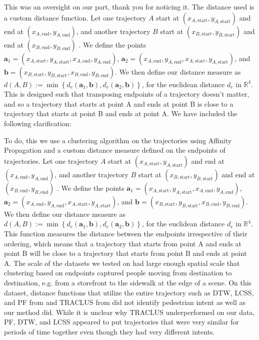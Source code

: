 \documentclass[usenames,dvipsnames]{article}
\providecommand{\response}[1]{
\noindent
\noindent\colorbox{gray!20}{
\parbox{\textwidth}{
\setlength{\parskip}{.1in}
\setlength{\parindent}{.1in}
#1}
}
}
\begin{document}
\begin{enumerate}
\begin{item}
This was an oversight on our part, thank you for noticing it. 
The distance used is a custom distance function. 
Let one trajectory $A$ start at $(x_{A,\mathrm{start}}, y_{A,\mathrm{start}})$ and end at  $(x_{A,\mathrm{end}}, y_{A,\mathrm{end}})$, and another trajectory $B$ start at $(x_{B,\mathrm{start}}, y_{B,\mathrm{start}})$ and end at $(x_{B,\mathrm{end}}, y_{B,\mathrm{end}})$ . 
We define the points $\mathbf{a}_1 = (x_{A, \mathrm{start}}, y_{A, \mathrm{start}}, x_{A, \mathrm{end}}, y_{A, \mathrm{end}})$, $\mathbf{a}_2 = (x_{A, \mathrm{end}}, y_{A, \mathrm{end}}, x_{A, \mathrm{start}}, y_{A, \mathrm{start}})$, and $\mathbf{b} = (x_{B, \mathrm{start}}, y_{B, \mathrm{start}}, x_{B, \mathrm{end}}, y_{B, \mathrm{end}})$. 
We then define our distance measure as $d(A, B) :=  \min \left\{ d_e(\mathbf{a}_1, \mathbf{b}), d_e(\mathbf{a}_2, \mathbf{b}) \right\}$, for the euclidean distance $d_e$ in $\mathbb{R}^4$.  This is designed such that transposing endpoints of a trajectory doesn't matter, and so a trajectory that starts at point A and ends at point B is close to a trajectory that starts at point B and ends at point A.  
We have included the following clarification:

\reversemarginpar{}
\response{To do, this we use a clustering algorithm on the trajectories using Affinity Propagation \cite{FreyDueck2007} and a custom distance measure defined on the endpoints of trajectories. 
	Let one trajectory $A$ start at $(x_{A,\mathrm{start}}, y_{A,\mathrm{start}})$ and end at  $(x_{A,\mathrm{end}}, y_{A,\mathrm{end}})$, and another trajectory $B$ start at $(x_{B,\mathrm{start}}, y_{B,\mathrm{start}})$ and end at $(x_{B,\mathrm{end}}, y_{B,\mathrm{end}})$ . 
	We define the points $\mathbf{a}_1 = (x_{A, \mathrm{start}}, y_{A, \mathrm{start}}, x_{A, \mathrm{end}}, y_{A, \mathrm{end}})$, $\mathbf{a}_2 = (x_{A, \mathrm{end}}, y_{A, \mathrm{end}}, x_{A, \mathrm{start}}, y_{A, \mathrm{start}})$, and $\mathbf{b} = (x_{B, \mathrm{start}}, y_{B, \mathrm{start}}, x_{B, \mathrm{end}}, y_{B, \mathrm{end}})$. 
	We then define our distance measure as $d(A, B) :=  \min \left\{ d_e(\mathbf{a}_1, \mathbf{b}), d_e(\mathbf{a}_2, \mathbf{b}) \right\}$, for the euclidean distance $d_e$ in $\mathbb{R}^4$. 
	This function measures the distance between the endpoints irrespective of their ordering, which means that a trajectory that starts from point A and ends at point B will be close to a trajectory that starts from point B and ends at point A.
	The scale of the datasets we tested on had large enough spatial scale that clustering based on endpoints captured people moving from destination to destination, e.g. from a storefront to the sidewalk at the edge of a scene. On this dataset, distance functions that utilize the entire trajectory such as DTW, LCSS, and PF from \cite{Morris2009} and TRACLUS from \cite{Lee2007} did not identify pedestrian intent as well as our method did. While it is unclear why TRACLUS underperformed on our data, PF, DTW, and LCSS appeared to put trajectories that were very similar for periods of time together even though they had very different intents.}
	

\end{item}
\end{enumerate}
\end{document}
